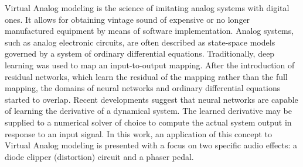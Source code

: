 Virtual Analog modeling is the science of imitating analog systems with digital ones. It allows for obtaining vintage sound of expensive or no longer manufactured equipment by means of software implementation. Analog systems, such as analog electronic circuits, are often described as state-space models governed by a system of ordinary differential equations. Traditionally, deep learning was used to map an input-to-output mapping. After the introduction of residual networks, which learn the residual of the mapping rather than the full mapping,  the domains of neural networks and ordinary differential equations started to overlap. Recent developments suggest that neural networks are capable of learning the derivative of a dynamical system. The learned derivative may be supplied to a numerical solver of choice to compute the actual system output in response to an input signal. In this work, an application of this concept to Virtual Analog modeling is presented with a focus on two specific audio effects: a diode clipper (distortion) circuit and a phaser pedal.
